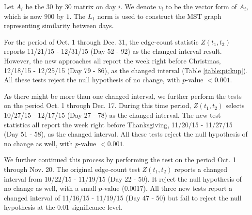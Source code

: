 \documentclass[arxiv, preprint]{imsart}
\numberwithin{equation}{section}
\theoremstyle{plain}
\begin{document}
Let $A_i$ be the $30$ by $30$ matrix on day $i$. We denote $v_i$ to be the vector form of $A_i$, which is now $900$ by $1$. The $L_1$ norm is used to construct the MST graph representing similarity between days.

For the period of Oct. 1 through Dec. 31, the edge-count statistic $Z(t_1,t_2)$ reports 11/21/15 - 12/31/15 (Day 52 - 92) as the changed interval result. However, the new approaches all report the week right before Christmas, 12/18/15 - 12/25/15 (Day 79 - 86), as the changed interval (Table \ref{table:pickup}).
All these tests reject the null hypothesis of no change, with $p$-value $<0.001$.   

As there might be more than one changed interval, we further perform the tests on the period Oct. 1 through Dec. 17.  %
During this time period, $Z(t_1,t_2)$ selects 10/27/15 - 12/17/15 (Day 27 - 78) as the changed interval. The new test statistics all report the week right before Thanksgiving, 11/20/15 - 11/27/15 (Day 51 - 58), as the changed interval.  All these tests reject the null hypothesis of no change as well, with $p$-value $<0.001$.

We further continued this process by performing the test on the period Oct. 1 through Nov. 20.  %
The original edge-count test  $Z(t_1,t_2)$ reports a changed interval from 10/22/15 - 11/19/15 (Day 22 - 50).  It reject the null hypothesis of no change as well, with a small $p$-value (0.0017).  All three new tests report a changed interval of 11/16/15 - 11/19/15 (Day 47 - 50) but fail to reject the null hypothesis at the $0.01$ significance level.
\end{document}
